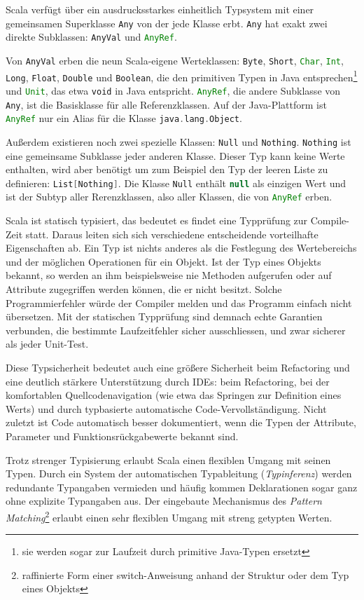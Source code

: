 \documentclass[a4paper, 12pt, hidelinks, listof=totoc, listoftables=totoc, bibliography=totoc]{scrreprt}
\newcommand{\scala}[1]{\lstinline[language=Scala, style=inline]|#1|}
\begin{document}
Scala verfügt über ein ausdrucksstarkes einheitlich Typsystem mit einer gemeinsamen Superklasse \scala{Any} von der jede Klasse erbt. \scala{Any} hat exakt zwei direkte Subklassen: \scala{AnyVal} und \scala{AnyRef}. 

Von \scala{AnyVal} erben die neun Scala-eigene Werteklassen: \scala{Byte}, \scala{Short}, \scala{Char}, \scala{Int}, \scala{Long}, \scala{Float}, \scala{Double} und \scala{Boolean}, die den primitiven Typen in Java entsprechen\footnote{sie werden sogar zur Laufzeit durch primitive Java-Typen ersetzt} und \scala{Unit}, das etwa \scala{void} in Java entspricht. \scala{AnyRef}, die andere Subklasse von \scala{Any}, ist die Basisklasse für alle Referenzklassen. Auf der Java-Plattform ist \scala{AnyRef} nur ein Alias für die Klasse \scala{java.lang.Object}. 

Außerdem existieren noch zwei spezielle Klassen: \scala{Null} und \scala{Nothing}. \scala{Nothing} ist eine gemeinsame Subklasse jeder anderen Klasse. Dieser Typ kann keine Werte enthalten, wird aber benötigt um zum Beispiel den Typ der leeren Liste zu definieren: \scala{List[Nothing]}. Die Klasse \scala{Null} enthält \scala{null} als einzigen Wert und ist der Subtyp aller Rerenzklassen, also aller Klassen, die von \scala{AnyRef} erben.

Scala ist statisch typisiert, das bedeutet es findet eine Typprüfung zur Compile-Zeit statt. Daraus leiten sich sich verschiedene entscheidende vorteilhafte Eigenschaften ab. Ein Typ ist nichts anderes als die Festlegung des Wertebereichs und der möglichen Operationen für ein Objekt. Ist der Typ eines Objekts bekannt, so werden an ihm beispielsweise nie Methoden aufgerufen oder auf Attribute zugegriffen werden können, die er nicht besitzt. Solche Programmierfehler würde der Compiler melden und das Programm einfach nicht übersetzen. Mit der statischen Typprüfung sind demnach echte Garantien verbunden, die bestimmte Laufzeitfehler sicher ausschliessen, und zwar sicherer als jeder Unit-Test.

Diese Typsicherheit bedeutet auch eine größere Sicherheit beim Refactoring und eine deutlich stärkere Unterstützung durch IDEs: beim Refactoring, bei der komfortablen Quellcodenavigation (wie etwa das Springen zur Definition eines Werts) und durch typbasierte automatische Code-Vervollständigung. Nicht zuletzt ist Code automatisch besser dokumentiert, wenn die Typen der Attribute, Parameter und Funktionsrückgabewerte bekannt sind.

Trotz strenger Typisierung erlaubt Scala einen flexiblen Umgang mit seinen Typen. Durch ein System der automatischen Typableitung (\textit{Typinferenz}) werden redundante Typangaben vermieden und häufig kommen Deklarationen sogar ganz ohne explizite Typangaben aus. Der eingebaute Mechanismus des \textit{Pattern Matching}\footnote{raffinierte Form einer switch-Anweisung anhand der Struktur oder dem Typ eines Objekts} erlaubt einen sehr flexiblen Umgang mit streng getypten Werten.
\end{document}
